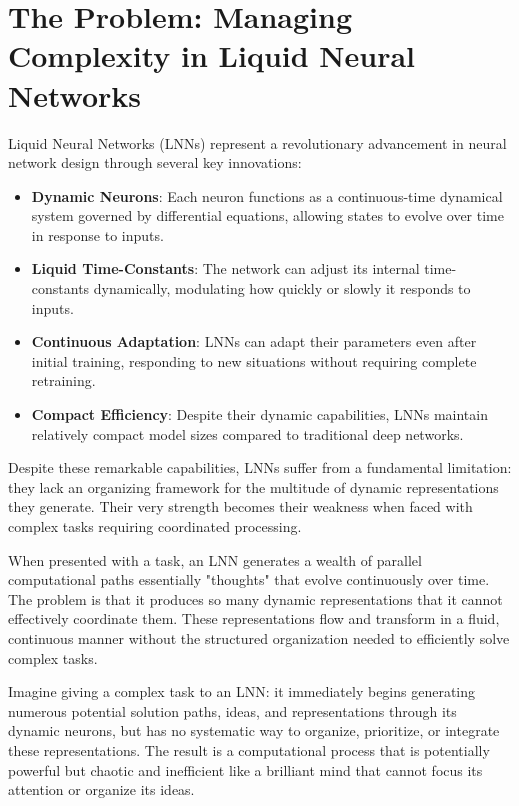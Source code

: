 \documentclass{article}
\begin{document}
\section{The Problem: Managing Complexity in Liquid Neural Networks}
\label{sec:problem}

Liquid Neural Networks (LNNs) represent a revolutionary advancement in neural network design through several key innovations:

\begin{itemize}
    \item \textbf{Dynamic Neurons}: Each neuron functions as a continuous-time dynamical system governed by differential equations, allowing states to evolve over time in response to inputs.
    \item \textbf{Liquid Time-Constants}: The network can adjust its internal time-constants dynamically, modulating how quickly or slowly it responds to inputs.
    \item \textbf{Continuous Adaptation}: LNNs can adapt their parameters even after initial training, responding to new situations without requiring complete retraining.
    \item \textbf{Compact Efficiency}: Despite their dynamic capabilities, LNNs maintain relatively compact model sizes compared to traditional deep networks.
\end{itemize}

Despite these remarkable capabilities, LNNs suffer from a fundamental limitation: they lack an organizing framework for the multitude of dynamic representations they generate. Their very strength becomes their weakness when faced with complex tasks requiring coordinated processing.

When presented with a task, an LNN generates a wealth of parallel computational paths essentially "thoughts" that evolve continuously over time. The problem is that it produces so many dynamic representations that it cannot effectively coordinate them. These representations flow and transform in a fluid, continuous manner without the structured organization needed to efficiently solve complex tasks.

Imagine giving a complex task to an LNN: it immediately begins generating numerous potential solution paths, ideas, and representations through its dynamic neurons, but has no systematic way to organize, prioritize, or integrate these representations. The result is a computational process that is potentially powerful but chaotic and inefficient like a brilliant mind that cannot focus its attention or organize its ideas.
\end{document}
